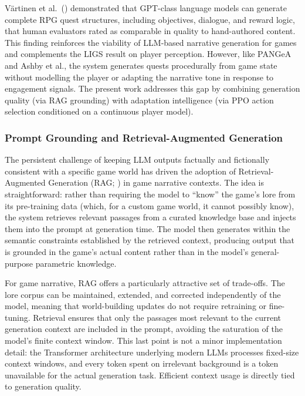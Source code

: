 V{\"a}rtinen et al.\ (\citeyear{vartinen2024generating}) demonstrated that GPT-class language models can generate complete RPG quest structures, including objectives, dialogue, and reward logic, that human evaluators rated as comparable in quality to hand-authored content. This finding reinforces the viability of LLM-based narrative generation for games and complements the LIGS result on player perception. However, like PANGeA and Ashby et al., the system generates quests procedurally from game state without modelling the player or adapting the narrative tone in response to engagement signals. The present work addresses this gap by combining generation quality (via RAG grounding) with adaptation intelligence (via PPO action selection conditioned on a continuous player model).

\subsubsection{Prompt Grounding and Retrieval-Augmented Generation}

The persistent challenge of keeping LLM outputs factually and fictionally consistent with a specific game world has driven the adoption of Retrieval-Augmented Generation (RAG; \citealp{lewis2020retrieval}) in game narrative contexts. The idea is straightforward: rather than requiring the model to ``know'' the game's lore from its pre-training data (which, for a custom game world, it cannot possibly know), the system retrieves relevant passages from a curated knowledge base and injects them into the prompt at generation time. The model then generates within the semantic constraints established by the retrieved context, producing output that is grounded in the game's actual content rather than in the model's general-purpose parametric knowledge.

For game narrative, RAG offers a particularly attractive set of trade-offs. The lore corpus can be maintained, extended, and corrected independently of the model, meaning that world-building updates do not require retraining or fine-tuning. Retrieval ensures that only the passages most relevant to the current generation context are included in the prompt, avoiding the saturation of the model's finite context window. This last point is not a minor implementation detail: the Transformer architecture underlying modern LLMs \citep{vaswani2017attention} processes fixed-size context windows, and every token spent on irrelevant background is a token unavailable for the actual generation task. Efficient context usage is directly tied to generation quality.

